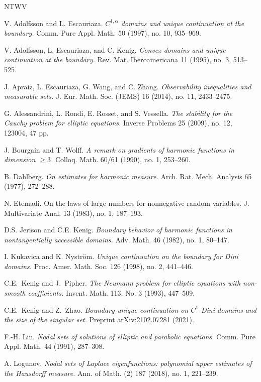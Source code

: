 \documentclass[11pt]{amsart}
\theoremstyle{definition}
\theoremstyle{remark}
\numberwithin{equation}{section}
\begin{document}
\begin{thebibliography}{NTWV}

 V. Adolfsson and L. Escauriaza. {\em $C^{1,\alpha}$ domains and unique continuation at the boundary.} Comm. Pure Appl. Math. 50 (1997), no. 10, 935--969. 

 V. Adolfsson, L. Escauriaza, and C. Kenig. {\em Convex domains and unique continuation at the boundary.} Rev. Mat. Iberoamericana 11 (1995), no. 3, 513--525. 

 J. Apraiz, L. Escauriaza, G. Wang, and C. Zhang. {\em Observability inequalities and measurable sets.} J. Eur. Math. Soc. (JEMS) 16 (2014), no. 11, 2433--2475.

 G. Alessandrini, L. Rondi, E. Rosset, and S. Vessella. {\em The stability for the Cauchy problem for elliptic equations.} Inverse Problems 25 (2009), no. 12, 123004, 47 pp. 

 J. Bourgain and T. Wolff. {\em
A remark on gradients of harmonic functions in dimension $\geq 3$.}
Colloq. Math. 60/61 (1990), no. 1, 253--260. 

 B. Dahlberg. {\em  
On estimates for harmonic measure.}
{Arch. Rat. Mech. Analysis} { 65} (1977), 272--288.

 N. Etemadi. {On the laws of large numbers for nonnegative random variables.} J. Multivariate Anal. 13 (1983), no. 1, 187--193.

 D.S. Jerison and C.E. Kenig. {\em Boundary behavior of harmonic functions in nontangentially accessible domains.} Adv. Math. 46 (1982), no. 1, 80--147.

 I. Kukavica and K. Nystr\"om. {\em Unique continuation on the boundary for Dini domains.} Proc. Amer. Math. Soc. 126 (1998), no. 2, 441--446.  

 C.E.\ Kenig and J.\ Pipher. {\em
The Neumann problem for elliptic equations with non-smooth coefficients.} 
Invent. Math. 113, No. 3 (1993), 447--509.

 C.E.\ Kenig and Z.\ Zhao. {\em Boundary unique continuation on $C^1$-Dini domains and the size of the singular set.} Preprint arXiv:2102.07281 (2021).

 F.-H. Lin. {\em Nodal sets of solutions of elliptic and parabolic equations.} Comm. Pure Appl. Math. 44 (1991), 287--308.

 A. Logunov. {\em Nodal sets of Laplace eigenfunctions: polynomial upper estimates of the Hausdorff measure.} Ann. of Math. (2) 187 (2018), no. 1, 221--239. 


\end{thebibliography}
\end{document}
